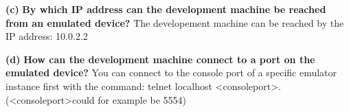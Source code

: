 \documentclass[11pt]{article}
\renewcommand\part[1]{\vspace{.10in}\textbf{(#1)}}
\begin{document}
\part{c} \textbf{By which IP address can the development machine be reached from an emulated device?}\newline
The developement machine can be reached by the IP address: 10.0.2.2

\part{d} \textbf{How can the development machine connect to a port on the emulated device?}\newline
You can connect to the console port of a specific emulator instance first with the command: \newline
telnet localhost \textless consoleport\textgreater . (\textless consoleport\textgreater could for example be 5554) 
\end{document}
